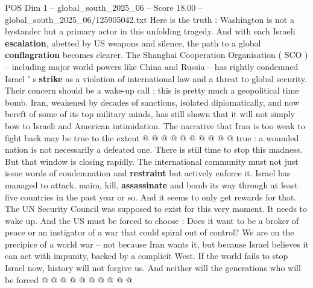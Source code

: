 \begin{textsample}{POS Dim 1 – global\_south\_2025\_06 – Score 18.00 – global\_south\_2025\_06/125905042.txt}
Here is the truth : Washington is not a bystander but a primary actor in this unfolding tragedy.
And with each Israeli \textbf{escalation}, abetted by US weapons and silence, the path to a global \textbf{conflagration} becomes clearer.
The Shanghai Cooperation Organisation ( SCO ) -- including major world powers like China and Russia -- has rightly condemned Israel ' s \textbf{strike} as a violation of international law and a threat to global security.
Their concern should be a wake-up call : this is pretty much a geopolitical time bomb.
Iran, weakened by decades of sanctions, isolated diplomatically, and now bereft of some of its top military minds, has still shown that it will not simply bow to Israeli and American intimidation.
The narrative that Iran is too weak to fight back may be true to the extent @ @ @ @ @ @ @ @ @ @ true : a wounded nation is not necessarily a defeated one.
There is still time to stop this madness.
But that window is closing rapidly.
The international community must not just issue words of condemnation and \textbf{restraint} but actively enforce it.
Israel has managed to attack, maim, kill, \textbf{assassinate} and bomb its way through at least five countries in the past year or so.
And it seems to only get rewards for that.
The UN Security Council was supposed to exist for this very moment.
It needs to wake up.
And the US must be forced to choose : Does it want to be a broker of peace or an instigator of a war that could spiral out of control?
We are on the precipice of a world war -- not because Iran wants it, but because Israel believes it can act with impunity, backed by a complicit West.
If the world fails to stop Israel now, history will not forgive us.
And neither will the generations who will be forced @ @ @ @ @ @ @ @ @ @

\end{textsample}
